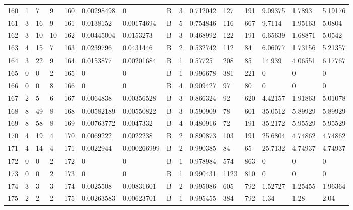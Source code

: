 \begin{latin}
\begin{longtable}{lllllllllllllll}
	160 & 1  & 7   & 9  & 160 & 0.00298498     & 0              & B & 3  & 0.712042 & 127  & 191  & 9.09375 & 1.7893  & 5.19176 \\
	161 & 3  & 16  & 9  & 161 & 0.0138152      & 0.00174694     & B & 5  & 0.754846 & 116  & 667  & 9.7114  & 1.95163 & 5.0804  \\
	162 & 3  & 10  & 10 & 162 & 0.00445004     & 0.0153273      & B & 3  & 0.468992 & 122  & 191  & 6.65639 & 1.68871 & 5.0542  \\
	163 & 4  & 15  & 7  & 163 & 0.0239796      & 0.0431446      & B & 2  & 0.532742 & 112  & 84   & 6.06077 & 1.73156 & 5.21357 \\
	164 & 3  & 22  & 9  & 164 & 0.0153877      & 0.00201684     & B & 1  & 0.57725  & 208  & 85   & 14.939  & 4.06551 & 6.17767 \\
	165 & 0  & 0   & 2  & 165 & 0              & 0              & B & 1  & 0.996678 & 381  & 221  & 0       & 0       & 0       \\
	166 & 0  & 0   & 8  & 166 & 0              & 0              & B & 4  & 0.909427 & 97   & 80   & 0       & 0       & 0       \\
	167 & 2  & 5   & 6  & 167 & 0.0064838      & 0.00356528     & B & 3  & 0.866324 & 92   & 620  & 4.42157 & 1.91863 & 5.01078 \\
	168 & 8  & 49  & 8  & 168 & 0.00582189     & 0.00550822     & B & 3  & 0.590909 & 78   & 601  & 35.0512 & 5.89929 & 5.89929 \\
	169 & 8  & 58  & 8  & 169 & 0.00763772     & 0.0047332      & B & 4  & 0.480916 & 72   & 191  & 35.2172 & 5.95529 & 5.95529 \\
	170 & 4  & 19  & 4  & 170 & 0.0069222      & 0.0022238      & B & 2  & 0.890873 & 103  & 191  & 25.6804 & 4.74862 & 4.74862 \\
	171 & 4  & 14  & 4  & 171 & 0.0022944      & 0.000266999    & B & 2  & 0.990385 & 84   & 65   & 25.7132 & 4.74937 & 4.74937 \\
	172 & 0  & 0   & 2  & 172 & 0              & 0              & B & 1  & 0.978984 & 574  & 863  & 0       & 0       & 0       \\
	173 & 0  & 0   & 2  & 173 & 0              & 0              & B & 1  & 0.990431 & 1123 & 810  & 0       & 0       & 0       \\
	174 & 3  & 3   & 3  & 174 & 0.0025508      & 0.00831601     & B & 2  & 0.995086 & 605  & 792  & 1.52727 & 1.25455 & 1.96364 \\
	175 & 2  & 2   & 2  & 175 & 0.00263583     & 0.00623701     & B & 1  & 0.995455 & 384  & 792  & 1.34    & 1.28    & 2.04    \\

\end{longtable}
\end{latin}

